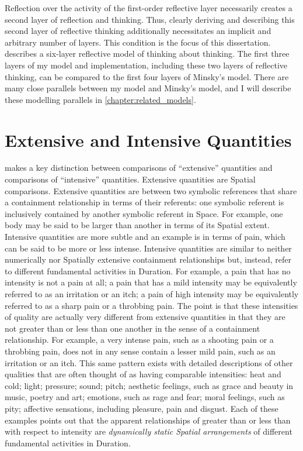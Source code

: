 Reflection over the activity of the first-order reflective layer
necessarily creates a second layer of reflection and thinking.  Thus,
clearly deriving and describing this second layer of reflective
thinking additionally necessitates an implicit and arbitrary number of
layers.  This condition is the focus of this dissertation.
\cite{minsky:2006} describes a six-layer reflective model of thinking
about thinking.  The first three layers of my model and
implementation, including these two layers of reflective thinking, can
be compared to the first four layers of Minsky's model.  There are
many close parallels between my model and Minsky's model, and I will
describe these modelling parallels in
\autoref{chapter:related_models}.

\section{Extensive and Intensive Quantities}
\label{section:extensive_and_intensive_quantities}

\cite{bergson:1910} makes a key distinction between comparisons of
``extensive'' quantities and comparisons of ``intensive'' quantities.
Extensive quantities are Spatial comparisons.  Extensive quantities
are between two symbolic references that share a containment
relationship in terms of their referents: one symbolic referent is
inclusively contained by another symbolic referent in Space.  For
example, one body may be said to be larger than another in terms of
its Spatial extent.  Intensive quantities are more subtle and an
example is in terms of pain, which can be said to be more or less
intense.  Intensive quantities are similar to neither numerically nor
Spatially extensive containment relationships but, instead, refer to
different fundamental activities in Duration.  For example, a pain
that has no intensity is not a pain at all; a pain that has a mild
intensity may be equivalently referred to as an irritation or an itch;
a pain of high intensity may be equivalently referred to as a sharp
pain or a throbbing pain.  The point is that these intensities of
quality are actually very different from extensive quantities in that
they are not greater than or less than one another in the sense of a
containment relationship.  For example, a very intense pain, such as a
shooting pain or a throbbing pain, does not in any sense contain a
lesser mild pain, such as an irritation or an itch.  This same pattern
exists with detailed descriptions of other qualities that are often
thought of as having comparable intensities: heat and cold; light;
pressure; sound; pitch; aesthetic feelings, such as grace and beauty
in music, poetry and art; emotions, such as rage and fear; moral
feelings, such as pity; affective sensations, including pleasure, pain
and disgust.  Each of these examples points out that the apparent
relationships of greater than or less than with respect to intensity
are \emph{dynamically static Spatial arrangements} of different
fundamental activities in Duration.

